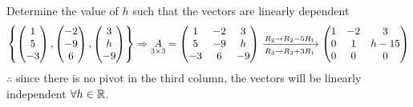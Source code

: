\begin{example}{}{}
    Determine the value of $h$ such that the vectors are linearly dependent 
    \[
        \left\{
            \begin{pmatrix}
                1 \\ 5 \\ -3
            \end{pmatrix},
            \begin{pmatrix}
                -2 \\ -9 \\ 6
            \end{pmatrix},
            \begin{pmatrix}
                3 \\ h \\ -9
            \end{pmatrix}
         \right\} \Rightarrow
        \underset{3 \times 3}{A} = 
        \begin{pmatrix}
            1 & -2 & 3 \\
            5 & -9 & h \\
            -3 & 6 & -9
        \end{pmatrix}
        \xrightarrow[R_3 \to R_3 + 3R_1]{R_2 \to R_2 - 5R_1}
        \begin{pmatrix}
            1 & -2 & 3 \\
            0 & 1 & h-15 \\
            0 & 0 & 0
        \end{pmatrix}
    \]
    $\therefore$ since there is no pivot in the third column, the vectors will be linearly independent $\forall h \in \mathbb R$.
\end{example}